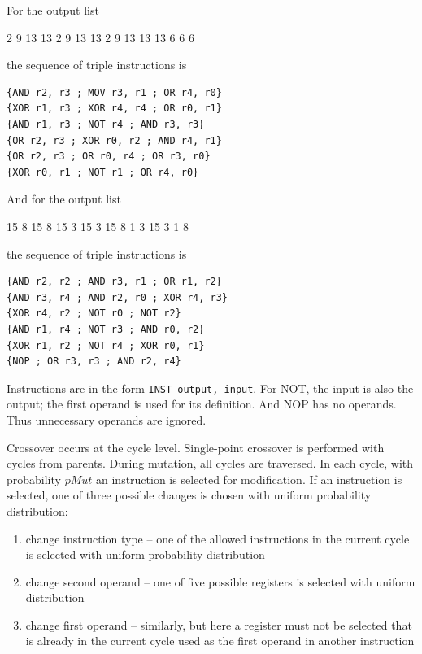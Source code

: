 For the output list
\begin{center}
2 9 13 13 2 9 13 13 2 9 13 13 13 6 6 6
\end{center}
the sequence of triple instructions is
\begin{center}
\begin{verbatim}
{AND r2, r3 ; MOV r3, r1 ; OR r4, r0}
{XOR r1, r3 ; XOR r4, r4 ; OR r0, r1}
{AND r1, r3 ; NOT r4 ; AND r3, r3}
{OR r2, r3 ; XOR r0, r2 ; AND r4, r1}
{OR r2, r3 ; OR r0, r4 ; OR r3, r0}
{XOR r0, r1 ; NOT r1 ; OR r4, r0}
\end{verbatim}
\end{center}

And for the output list
\begin{center}
15 8 15 8 15 3 15 3 15 8 1 3 15 3 1 8
\end{center}
the sequence of triple instructions is
\begin{center}
\begin{verbatim}
{AND r2, r2 ; AND r3, r1 ; OR r1, r2}
{AND r3, r4 ; AND r2, r0 ; XOR r4, r3}
{XOR r4, r2 ; NOT r0 ; NOT r2}
{AND r1, r4 ; NOT r3 ; AND r0, r2}
{XOR r1, r2 ; NOT r4 ; XOR r0, r1}
{NOP ; OR r3, r3 ; AND r2, r4}
\end{verbatim}
\end{center}
Instructions are in the form \verb|INST output, input|.
For NOT, the input is also the output; the first operand is used for its definition.
And NOP has no operands. Thus unnecessary operands are ignored.

Crossover occurs at the cycle level. Single-point crossover is performed with cycles from parents.
During mutation, all cycles are traversed. In each cycle, with probability $pMut$ an
instruction is selected for modification. If an instruction is selected, one of three possible changes is chosen
with uniform probability distribution:
\begin{enumerate}
  \item change instruction type -- one of the allowed instructions
  in the current cycle is selected with uniform probability distribution
  \item change second operand -- one of five possible registers is selected with uniform distribution
  \item change first operand -- similarly, but here a register must not be selected that is already in the current cycle
  used as the first operand in another instruction
\end{enumerate}

